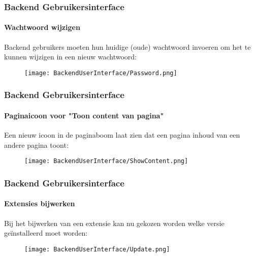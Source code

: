 \begin{frame}[fragile]
	\frametitle{Backend Gebruikersinterface}
	\framesubtitle{Wachtwoord wijzigen}

	Backend gebruikers moeten hun huidige (oude) wachtwoord invoeren om het te
	kunnen wijzigen in een nieuw wachtwoord:

	\begin{figure}
		\texttt{[image: BackendUserInterface/Password.png]}
	\end{figure}

\end{frame}

\begin{frame}[fragile]
	\frametitle{Backend Gebruikersinterface}
	\framesubtitle{Paginaicoon voor "Toon content van pagina"}

	Een nieuw icoon in de paginaboom laat zien dat een pagina inhoud van een andere
	pagina toont:

	\begin{figure}
		\texttt{[image: BackendUserInterface/ShowContent.png]}
	\end{figure}

\end{frame}

\begin{frame}[fragile]
	\frametitle{Backend Gebruikersinterface}
	\framesubtitle{Extensies bijwerken}

	Bij het bijwerken van een extensie kan nu gekozen worden welke versie
	geïnstalleerd moet worden:

	\begin{figure}
		\texttt{[image: BackendUserInterface/Update.png]}
	\end{figure}

\end{frame}

